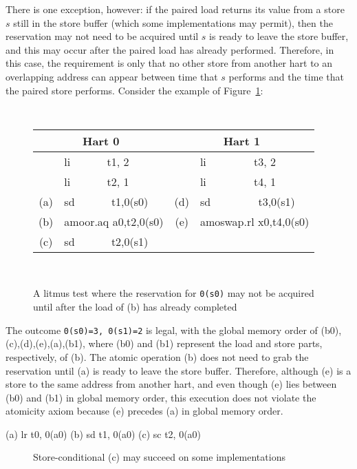 There is one exception, however: if the paired load returns its value from a store $s$ still in the store buffer (which some implementations may permit), then the reservation may not need to be acquired until $s$ is ready to leave the store buffer, and this may occur after the paired load has already performed.
Therefore, in this case, the requirement is only that no other store from another hart to an overlapping address can appear between time that $s$ performs and the time that the paired store performs.
Consider the example of Figure~\ref{fig:litmus:lateatomic}:

\begin{figure}[h!]
  \centering
  {
    \setlength{\tabcolsep}{2mm}
    \tt\footnotesize
    \begin{tabular}{cl||cl}
    \multicolumn{2}{c}{Hart 0} & \multicolumn{2}{c}{Hart 1} \\
    \hline
          & li~~~~~~ t1, 2       &     & li~~~~~~~~ t3, 2    \\
          & li~~~~~~ t2, 1       &     & li~~~~~~~~ t4, 1    \\
      (a) & sd~~~~~~ t1,0(s0)    & (d) & sd~~~~~~~~ t3,0(s1) \\
      (b) & amoor.aq a0,t2,0(s0) & (e) & amoswap.rl x0,t4,0(s0) \\
      (c) & sd~~~~~~ t2,0(s1)    &     &             \\
    \end{tabular}
  }
  ~~
  \diagram
  \caption{A litmus test where the reservation for {\tt 0(s0)} may not be acquired until after the load of (b) has already completed}
  \label{fig:litmus:lateatomic}
\end{figure}

The outcome {\tt 0(s0)=3, 0(s1)=2} is legal, with the global memory order of (b0),(c),(d),(e),(a),(b1), where (b0) and (b1) represent the load and store parts, respectively, of (b).
The atomic operation (b) does not need to grab the reservation until (a) is ready to leave the store buffer.
Therefore, although (e) is a store to the same address from another hart, and even though (e) lies between (b0) and (b1) in global memory order, this execution does not violate the atomicity axiom because (e) precedes (a) in global memory order.

\begin{verbbox}
(a) lr t0, 0(a0)
(b) sd t1, 0(a0)
(c) sc t2, 0(a0)
\end{verbbox}
\begin{figure}[h!]
  \centering\small
  \theverbbox
  \caption{Store-conditional (c) may succeed on some implementations}
  \label{fig:litmus:lrsdsc}
\end{figure}

